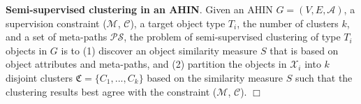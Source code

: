 \begin{definition}
\textbf{Semi-supervised clustering in an AHIN}.
\label{def:clustering}
Given an AHIN $G = (V,E,\mathcal{A})$, a supervision constraint ($\mathcal{M}$, $\mathcal{C}$),
a target object type $T_i$, the number of clusters $k$, and a set of meta-paths $\mathcal{PS}$,
the problem of semi-supervised clustering of type $T_i$ objects in $G$ is to
(1) discover an object similarity measure $S$ that is based on object attributes and meta-paths, and
(2) partition the objects in $\mathcal{X}_i$ into $k$ disjoint clusters $\mathfrak{C} = \{C_1, ..., C_k\}$
based on the similarity measure $S$ such that the clustering results best agree with the constraint 
($\mathcal{M}$, $\mathcal{C}$).
\hfill$\Box$
\end{definition}


%

